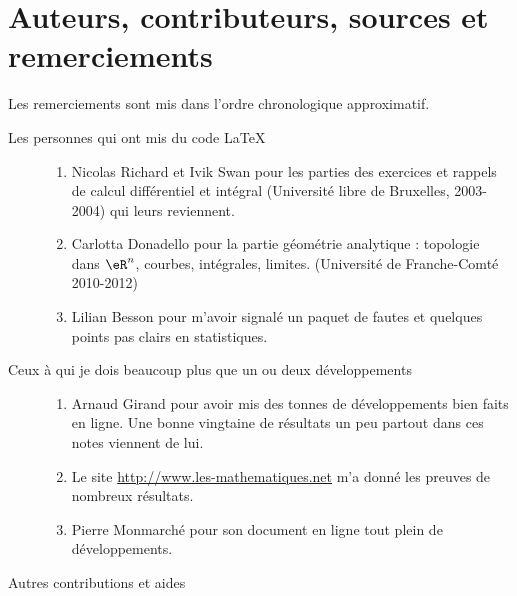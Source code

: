 \section{Auteurs, contributeurs, sources et remerciements}

Les remerciements sont mis dans l'ordre chronologique approximatif.

\begin{description}
    \item[Les personnes qui ont mis du code \LaTeX] 
        \begin{enumerate}
            \item
                Nicolas Richard et Ivik Swan pour les parties des exercices et rappels de calcul différentiel et intégral (Université libre de Bruxelles, 2003-2004) qui leurs reviennent.
            \item
                Carlotta Donadello pour la partie géométrie analytique : topologie dans \( \eR^n\), courbes, intégrales, limites. (Université de Franche-Comté 2010-2012)
            \item
                Lilian Besson pour m'avoir signalé un paquet de fautes et quelques points pas clairs en statistiques.
        \end{enumerate}
    \item[Ceux à qui je dois beaucoup plus que un ou deux développements]
        \begin{enumerate}
            \item 
                Arnaud Girand\cite{KXjFWKA} pour avoir mis des tonnes de développements bien faits en ligne. Une bonne vingtaine de résultats un peu partout dans ces notes viennent de lui.
            \item
                Le site \url{http://www.les-mathematiques.net} m'a donné les preuves de nombreux résultats.
            \item
                Pierre Monmarché\cite{PAXrsMn} pour son document en ligne tout plein de développements. 
        \end{enumerate}
    \item[Autres contributions et aides]



\end{description}
